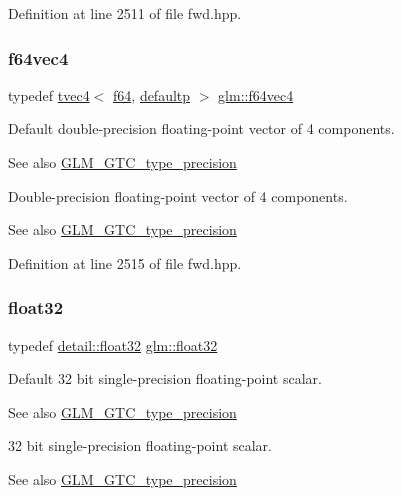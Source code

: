 Definition at line 2511 of file fwd.\+hpp.

\mbox{\label{group__gtc__type__precision_ga9d896f484039b22873e7bfb9e06f7b47}} 
\subsubsection{\texorpdfstring{f64vec4}{f64vec4}}
{\footnotesize\ttfamily typedef \mbox{\hyperlink{structglm_1_1tvec4}{tvec4}}$<$ \mbox{\hyperlink{group__gtc__type__precision_ga2bba392e555124b36cde6abba349bab3}{f64}}, \mbox{\hyperlink{namespaceglm_a0f04f086094c747d227af4425893f545a9d21ccd8b5a009ec7eb7677befc3bf51}{defaultp}} $>$ \mbox{\hyperlink{group__gtc__type__precision_ga9d896f484039b22873e7bfb9e06f7b47}{glm\+::f64vec4}}}

Default double-\/precision floating-\/point vector of 4 components. \begin{DoxySeeAlso}{See also}
\mbox{\hyperlink{group__gtc__type__precision}{G\+L\+M\+\_\+\+G\+T\+C\+\_\+type\+\_\+precision}}
\end{DoxySeeAlso}
Double-\/precision floating-\/point vector of 4 components. \begin{DoxySeeAlso}{See also}
\mbox{\hyperlink{group__gtc__type__precision}{G\+L\+M\+\_\+\+G\+T\+C\+\_\+type\+\_\+precision}} 
\end{DoxySeeAlso}


Definition at line 2515 of file fwd.\+hpp.

\mbox{\label{group__gtc__type__precision_ga814f2f65354b6588b067cc5c67a6b340}} 
\subsubsection{\texorpdfstring{float32}{float32}}
{\footnotesize\ttfamily typedef \mbox{\hyperlink{namespaceglm_1_1detail_ad60558c5c304624de0b54c51b5857737}{detail\+::float32}} \mbox{\hyperlink{group__gtc__type__precision_ga814f2f65354b6588b067cc5c67a6b340}{glm\+::float32}}}

Default 32 bit single-\/precision floating-\/point scalar. \begin{DoxySeeAlso}{See also}
\mbox{\hyperlink{group__gtc__type__precision}{G\+L\+M\+\_\+\+G\+T\+C\+\_\+type\+\_\+precision}}
\end{DoxySeeAlso}
32 bit single-\/precision floating-\/point scalar. \begin{DoxySeeAlso}{See also}
\mbox{\hyperlink{group__gtc__type__precision}{G\+L\+M\+\_\+\+G\+T\+C\+\_\+type\+\_\+precision}} 
\end{DoxySeeAlso}


